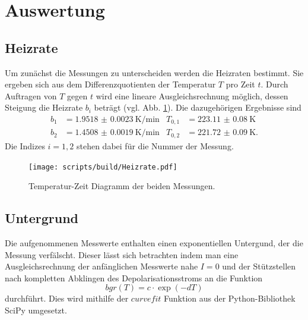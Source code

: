 \section{Auswertung}
\label{sec:Auswertung}

\subsection{Heizrate}

Um zunächst die Messungen zu unterscheiden werden die Heizraten bestimmt. Sie ergeben sich aus dem Differenzquotienten der Temperatur $T$ pro Zeit $t$.
Durch Auftragen von $T$ gegen $t$ wird eine lineare Ausgleichsrechnung möglich, dessen Steigung die Heizrate $b_i$ beträgt (vgl. Abb. \ref{fig:heiz}).
Die dazugehörigen Ergebnisse sind
\begin{align}
    b_1 &= \qty{1.9518(23)}{\kelvin\per\minute} & T_{0,1} &= \qty{223.11(8)}{\kelvin} \\
    b_2 &= \qty{1.4508(19)}{\kelvin\per\minute} & T_{0,2} &= \qty{221.72(9)}{\kelvin}.
\end{align}
Die Indizes $i = 1,2$ stehen dabei für die Nummer der Messung.

\begin{figure}
    \centering
    \texttt{[image: scripts/build/Heizrate.pdf]}
    \caption{Temperatur-Zeit Diagramm der beiden Messungen.}
    \label{fig:heiz}
\end{figure}

\subsection{Untergrund}
Die aufgenommenen Messwerte enthalten einen exponentiellen Untergund, der die Messung verfälscht.
Dieser lässt sich betrachten indem man eine Ausgleichsrechnung der anfänglichen Messwerte nahe $I=0$ und der Stützstellen nach kompletten Abklingen des Depolarisationsstroms
an die Funktion
\begin{equation}
    bgr(T) = c \cdot \exp(-dT)
\end{equation}
durchführt. Dies wird mithilfe der $curve fit$ Funktion aus der Python-Bibliothek SciPy\cite{scipy} umgesetzt. 

